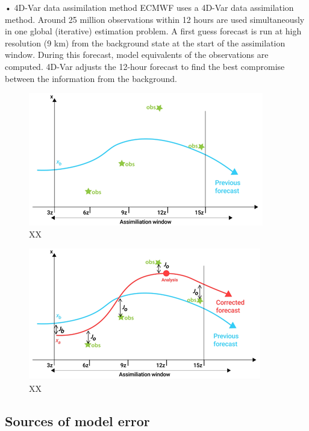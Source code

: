 \documentclass[12pt,oneside]{book}
\begin{document}
\begin{enumerate}
  • 4D-Var data assimilation method ECMWF uses a 4D-Var data
  assimilation method. Around 25 million observations within 12 hours
  are used simultaneously in one global (iterative) estimation problem.
  A first guess forecast is run at high resolution (9 km) from the
  background state at the start of the assimilation window. During this
  forecast, model equivalents of the observations are computed. 4D-Var
  adjusts the 12-hour forecast to find the best compromise between the
  information from the background.
\end{enumerate}

\begin{figure}

{\centering \includegraphics[width=0.8\linewidth]{figures/Figure75} 

}

\caption{XX}\label{fig:DataAssimilation3}
\end{figure}

\begin{figure}

{\centering \includegraphics[width=0.8\linewidth]{figures/Figure76} 

}

\caption{XX}\label{fig:DataAssimilation4}
\end{figure}

\subsection{Sources of model error}\label{sources-of-model-error}
\end{document}

